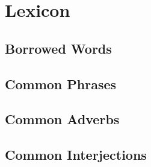 \chapter{Lexicon}
	\section{Borrowed Words}
	\section{Common Phrases}
	\section{Common Adverbs}
	\section{Common Interjections}
